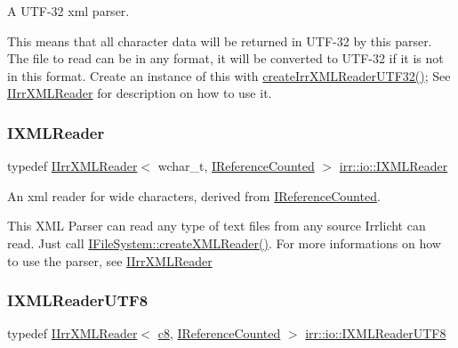 A U\+T\+F-\/32 xml parser. 

This means that all character data will be returned in U\+T\+F-\/32 by this parser. The file to read can be in any format, it will be converted to U\+T\+F-\/32 if it is not in this format. Create an instance of this with \hyperlink{namespaceirr_1_1io_a69d4b7a461a7a0b8715d346bbe9a49b0}{create\+Irr\+X\+M\+L\+Reader\+U\+T\+F32()}; See \hyperlink{classirr_1_1io_1_1IIrrXMLReader}{I\+Irr\+X\+M\+L\+Reader} for description on how to use it. \mbox{\label{namespaceirr_1_1io_ab620b13630f0818f3eefc000f6917fe4}} 
\subsubsection{\texorpdfstring{I\+X\+M\+L\+Reader}{IXMLReader}}
{\footnotesize\ttfamily typedef \hyperlink{classirr_1_1io_1_1IIrrXMLReader}{I\+Irr\+X\+M\+L\+Reader}$<$ wchar\+\_\+t, \hyperlink{classirr_1_1IReferenceCounted}{I\+Reference\+Counted} $>$ \hyperlink{namespaceirr_1_1io_ab620b13630f0818f3eefc000f6917fe4}{irr\+::io\+::\+I\+X\+M\+L\+Reader}}



An xml reader for wide characters, derived from \hyperlink{classirr_1_1IReferenceCounted}{I\+Reference\+Counted}. 

This X\+ML Parser can read any type of text files from any source Irrlicht can read. Just call \hyperlink{classirr_1_1io_1_1IFileSystem_a167c9fa159d16ee5c56c074636b0865e}{I\+File\+System\+::create\+X\+M\+L\+Reader()}. For more informations on how to use the parser, see \hyperlink{classirr_1_1io_1_1IIrrXMLReader}{I\+Irr\+X\+M\+L\+Reader} \mbox{\label{namespaceirr_1_1io_a87616ca0bcc3d6424d2c2edfcb743193}} 
\subsubsection{\texorpdfstring{I\+X\+M\+L\+Reader\+U\+T\+F8}{IXMLReaderUTF8}}
{\footnotesize\ttfamily typedef \hyperlink{classirr_1_1io_1_1IIrrXMLReader}{I\+Irr\+X\+M\+L\+Reader}$<$ \hyperlink{namespaceirr_a9395eaea339bcb546b319e9c96bf7410}{c8}, \hyperlink{classirr_1_1IReferenceCounted}{I\+Reference\+Counted} $>$ \hyperlink{namespaceirr_1_1io_a87616ca0bcc3d6424d2c2edfcb743193}{irr\+::io\+::\+I\+X\+M\+L\+Reader\+U\+T\+F8}}




